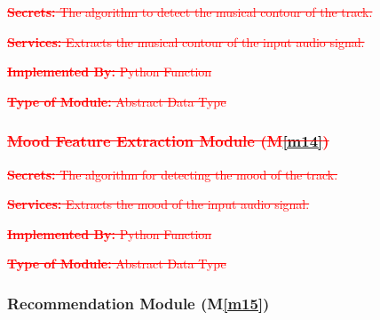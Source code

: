 \documentclass[12pt, titlepage]{article}
\newcommand{\mref}[1]{M\ref{#1}}
\begin{document}
\begin{description}
\item \textcolor{red}{\sout{\textbf{Secrets:} The algorithm to detect the musical contour of the track.}}
\item \textcolor{red}{\sout{\textbf{Services:} Extracts the musical contour of the input audio signal.}}
\item \textcolor{red}{\sout{\textbf{Implemented By:} Python Function}}
\item \textcolor{red}{\sout{\textbf{Type of Module:} Abstract Data Type}}
\end{description}


\subsubsection*{\textcolor{red}{\sout{Mood Feature Extraction Module (\mref{m14})}}}

\begin{description}
\item \textcolor{red}{\sout{\textbf{Secrets:} The algorithm for detecting the mood of the track.}}
\item \textcolor{red}{\sout{\textbf{Services:} Extracts the mood of the input audio signal.}}
\item \textcolor{red}{\sout{\textbf{Implemented By:} Python Function}}
\item \textcolor{red}{\sout{\textbf{Type of Module:} Abstract Data Type}}
\end{description}

\subsubsection{Recommendation Module (\mref{m15})}
\end{document}
